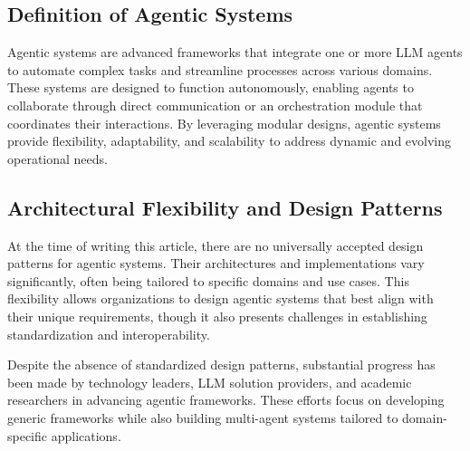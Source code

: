 \documentclass[12pt]{article}
\begin{document}
\subsection{Definition of Agentic Systems}
Agentic systems are advanced frameworks that integrate one or more LLM agents to automate complex tasks and streamline processes across various domains. These systems are designed to function autonomously, enabling agents to collaborate through direct communication or an orchestration module that coordinates their interactions. By leveraging modular designs, agentic systems provide flexibility, adaptability, and scalability to address dynamic and evolving operational needs.

\subsection{Architectural Flexibility and Design Patterns}
At the time of writing this article, there are no universally accepted design patterns for agentic systems. Their architectures and implementations vary significantly, often being tailored to specific domains and use cases. This flexibility allows organizations to design agentic systems that best align with their unique requirements, though it also presents challenges in establishing standardization and interoperability.

Despite the absence of standardized design patterns, substantial progress has been made by technology leaders, LLM solution providers, and academic researchers in advancing agentic frameworks. These efforts focus on developing generic frameworks while also building multi-agent systems tailored to domain-specific applications.
\end{document}
